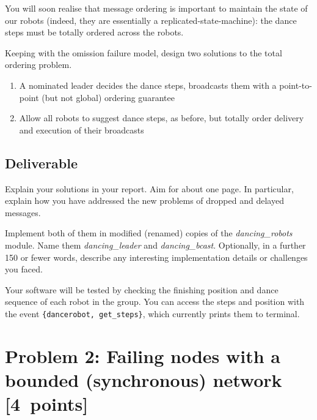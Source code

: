 \documentclass[a4paper]{article}
\begin{document}
You will soon realise that message ordering is important to maintain the state
of our robots (indeed, they are essentially a replicated-state-machine): the
dance steps must be totally ordered across the robots.

Keeping with the omission failure model, design two solutions to the total
ordering problem.
\begin{enumerate}

  \item A nominated leader decides the dance steps, broadcasts them with a
  point-to-point (but not global) ordering guarantee

  \item Allow all robots to suggest dance steps, as before, but totally order
  delivery and execution of their broadcasts

\end{enumerate}

\subsection*{Deliverable} %
\label{sub:p1_deliverable}

Explain your solutions in your report. Aim for about one page.
In particular, explain how you have addressed the new
problems of dropped and delayed messages.

Implement both of them in modified (renamed) copies of the
\emph{dancing\_robots} module. Name them \emph{dancing\_leader} and
\emph{dancing\_bcast}. Optionally, in a further 150 or fewer words, describe any
interesting implementation details or challenges you faced.

Your software will be tested by checking the finishing position and dance
sequence of each robot in the group. You can access the steps and position
with the event \verb!{dancerobot, get_steps}!, which currently prints them
to terminal.












\section*{Problem 2: Failing nodes with a bounded (synchronous) network [4~points]} %
\label{sec:problem_2_failing_nodes}
\end{document}
